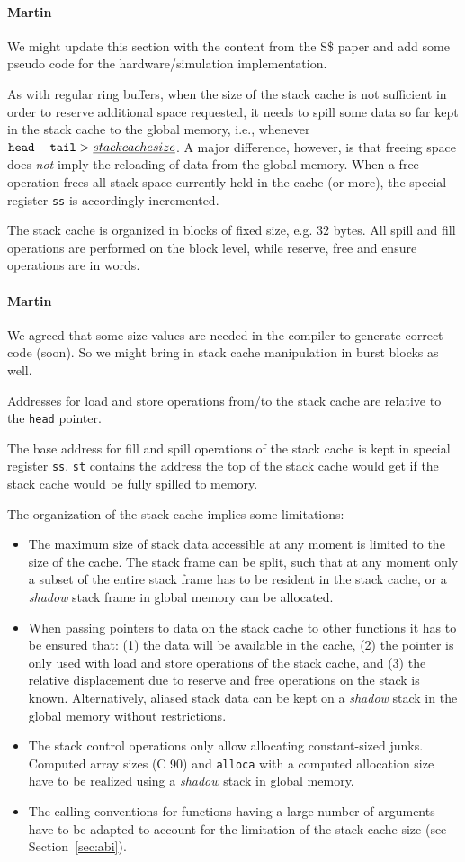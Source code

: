 \documentclass{IEEEtran}
\newcommand{\comment}[3]{\paragraph*{\textbf{#1}}{\color{#3}#2}}
\newcommand{\martin}[1]{\comment{Martin}{#1}{Blue}}
\begin{document}
\martin{We might update this section with the content from the S\$ paper
and add some pseudo code for the hardware/simulation implementation.}

As with regular ring buffers, when the size of the stack cache is not sufficient
in order to reserve additional space requested, it needs to spill some data
so far kept in the stack cache to the global memory, i.e., whenever
$\mathtt{head} - \mathtt{tail} > \emph{stack cache size}$. A major difference,
however, is that freeing space does \emph{not} imply the reloading of data from
the global memory. When a free operation frees all stack space currently held in
the cache (or more), the special register \texttt{ss} is accordingly
incremented.

The stack cache is organized in blocks of fixed size, e.g. $32$ bytes. All
spill and fill operations are performed on the block level, while reserve, free
and ensure operations are in words.
\martin{We agreed that some size values are needed in the compiler to
generate correct code (soon). So we might bring in stack cache manipulation
in burst blocks as well.}

Addresses for load and store operations from/to the stack cache are relative to
the \texttt{head} pointer.

The base address for fill and spill operations of the stack cache is kept in
special register \texttt{ss}. \texttt{st} contains the address the top of the
stack cache would get if the stack cache would be fully spilled to memory.

The organization of the stack cache implies some limitations:
\begin{itemize}
  \item The maximum size of stack data accessible at any moment is limited to
        the size of the cache. The stack frame can be split, such that at any
        moment only a subset of the entire stack frame has to be resident in the
        stack cache, or a \emph{shadow} stack frame in global memory can be
        allocated.
  \item When passing pointers to data on the stack cache to other functions it
        has to be ensured that: (1) the data will be available in the cache, (2)
        the pointer is only used  with load and store operations of the stack
        cache, and (3) the relative displacement due to reserve and free
        operations on the stack is known. Alternatively, aliased stack data can
        be kept on a \emph{shadow} stack in the global memory without
        restrictions.
  \item The stack control operations only allow allocating constant-sized junks.
        Computed array sizes (C 90) and \texttt{alloca} with a computed
        allocation size have to be realized using a \emph{shadow} stack in
        global memory.
  \item The calling conventions for functions having a large number of arguments
        have to be adapted to account for the limitation of the stack cache
        size (see Section~\ref{sec:abi}).
\end{itemize}
\end{document}

